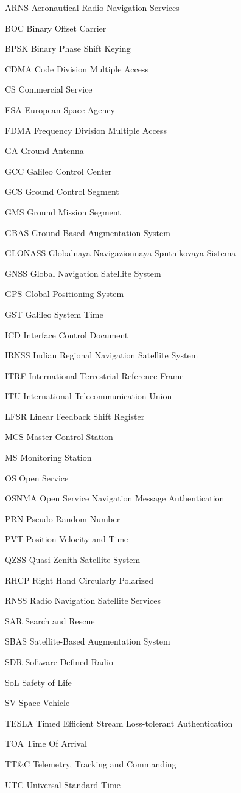 \begin{abbreviations}

\item[ARNS] Aeronautical Radio Navigation Services
\item[BOC] Binary Offset Carrier
\item[BPSK] Binary Phase Shift Keying
\item[CDMA] Code Division Multiple Access
\item[CS] Commercial Service
\item[ESA] European Space Agency
\item[FDMA] Frequency Division Multiple Access
\item[GA] Ground Antenna
\item[GCC] Galileo Control Center
\item[GCS] Ground Control Segment
\item[GMS] Ground Mission Segment 
\item[GBAS] Ground-Based Augmentation System
\item[GLONASS] Globalnaya Navigazionnaya Sputnikovaya Sistema
\item[GNSS] Global Navigation Satellite System
\item[GPS] Global Positioning System
\item[GST] Galileo System Time
\item[ICD] Interface Control Document
\item[IRNSS] Indian Regional Navigation Satellite System
\item[ITRF] International Terrestrial Reference Frame
\item[ITU] International Telecommunication Union
\item[LFSR] Linear Feedback Shift Register
\item[MCS] Master Control Station
\item[MS] Monitoring Station
\item[OS] Open Service
\item[OSNMA] Open Service Navigation Message Authentication
\item[PRN] Pseudo-Random Number
\item[PVT] Position Velocity and Time
\item[QZSS] Quasi-Zenith Satellite System
\item[RHCP] Right Hand Circularly Polarized
\item[RNSS] Radio Navigation Satellite Services
\item[SAR] Search and Rescue
\item[SBAS] Satellite-Based Augmentation System
\item[SDR] Software Defined Radio
\item[SoL] Safety of Life
\item[SV] Space Vehicle
\item[TESLA] Timed Efficient Stream Loss-tolerant Authentication
\item[TOA] Time Of Arrival
\item[TT&C] Telemetry, Tracking and Commanding
\item[UTC] Universal Standard Time

\end{abbreviations}
